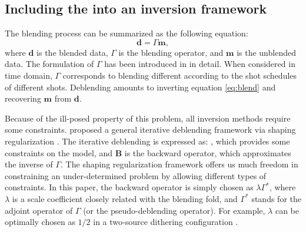 \subsection{Including the  into an inversion framework}
The blending process can be summarized as the following equation: 
\begin{equation}
\label{eq:blend}
\mathbf{d}=\Gamma\mathbf{m},
\end{equation}
where $\mathbf{d}$ is the blended data, $\Gamma$ is the blending operator, and $\mathbf{m}$ is the unblended data.
The formulation of $\Gamma$ has been introduced in \cite{arazthesis2012} in detail. When considered in time domain, $\Gamma$ corresponds to blending different  according to the shot schedules of different shots. Deblending amounts to inverting equation \ref{eq:blend} and recovering $\mathbf{m}$ from $\mathbf{d}$.


Because of the ill-posed property of this problem, all inversion methods require some constraints. \cite{yangkang20142} proposed a general iterative deblending framework via shaping regularization \cite{fomel2007shape}. The iterative deblending is expressed as:
, which provides some constraints on the model, and $\mathbf{B}$ is the backward operator, which approximates the inverse of $\Gamma$. The shaping regularization framework offers us much freedom in constraining an under-determined problem by allowing different types of constraints.  In this paper, the backward operator is simply chosen as $\lambda\Gamma^*$, where $\lambda$ is a scale coefficient closely related with the blending fold, and $\Gamma^*$ stands for the adjoint operator of $\Gamma$ (or the pseudo-deblending operator). For example, $\lambda$ can be optimally chosen as $1/2$ in a two-source dithering configuration \cite[]{yangkang20142,arazthesis2012}. %

